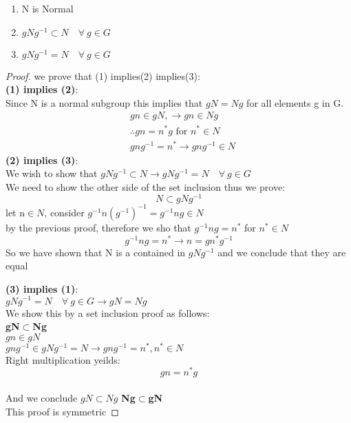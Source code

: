\documentclass[11pt]{article}
\theoremstyle{definition}  %
\newcommand{\block}[2]{\begin{tcolorbox}[title={#1}]{#2}\end{tcolorbox}}
\begin{document}
\block{Let N be a sugroup of a group G then the following are equivilant }{\begin{enumerate}
  \item N is Normal
  \item$ gNg^{-1}\subset N \quad \forall \ g\in G$
  \item  $gNg^{-1}=N \quad \forall\ g \in G $
\end{enumerate}
\begin{proof}
  we prove that (1) implies(2) implies(3):\\
  \textbf{(1) implies (2)}:\\
  Since N is a normal subgroup this implies that $gN=Ng$ for all elements g in G. \\
  \begin{align*}
    &gn\in gN, \rightarrow gn\in Ng\\
    &\therefore gn=n^*g \text{ for }n^*\in N\\
    &gng^{-1}=n^*\rightarrow gng^{-1}\in N
  \end{align*}
  \textbf{(2) implies (3)}:\\
  We wish to show that $  gNg^{-1}\subset N\rightarrow gNg^{-1}=N\quad \forall\ g\in G $\\
  We need to show the other side of the set inclusion thus we prove:
  \[
    N\subset gNg^{-1}
  \]
  let n$\in N$, consider $g^{-1}n(g^{-1})^{-1}=g^{-1}ng\in N $\\ by the previous proof, therefore we sho that $g^{-1}ng=n^*$ for $n^*\in N$ \\
  \[
    g^{-1}ng=n^*\rightarrow n=gn^*g^{-1}
  \]
  So we have shown that N is a contained in $gNg^{-1}$ and we conclude that they are equal

  \textbf{(3) implies (1)}:\\
      $gNg^{-1}=N\quad \forall\ g\in G \rightarrow gN=Ng$\\
      We show this by a set inclusion proof as follows:
      \\\textbf{gN$\subset$Ng}\\
      $gn\in gN$\\
      $gng^{-1}\in gNg^{-1}=N\rightarrow gng^{-1}=n^*, n^*\in N$\\ Right multiplication yeilds:
      \[
        gn=n^*g
      \]\\
      And we conclude $gN\subset Ng$
      \textbf{Ng$\subset$gN}\\
      This proof is symmetric
\end{proof}}
\block{Theorem: G is always a normal subgroup of itself. }{}
\
\end{document}
